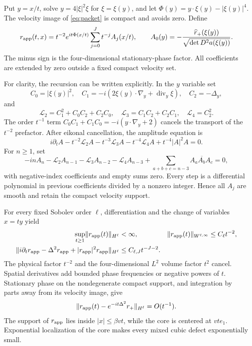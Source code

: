 \documentclass[11pt]{article}
\theoremstyle{definition}
\theoremstyle{remark}
\DeclareMathOperator{\diver}{div}
\newcommand{\norm}[1]{\lVert #1\rVert}
\begin{document}
Put $y=x/t$, solve $y=4|\xi|^2\xi$ for $\xi=\xi(y)$, and let $\Phi(y)=y\cdot\xi(y)-|\xi(y)|^4$. The velocity image of \eqref{eq:packet} is compact and avoids zero. Define
\begin{equation}\label{eq:wkb}
 r_{\rm app}(t,x)=t^{-2}e^{it\Phi(x/t)}
                 \sum_{j=0}^Jt^{-j}A_j(x/t),\qquad
 A_0(y)=-\frac{\widehat r_+(\xi(y))}
                   {\sqrt{\det D^2a(\xi(y))}}.
\end{equation}
The minus sign is the four-dimensional stationary-phase factor. All coefficients are extended by zero outside a fixed compact velocity set.

For clarity, the recursion can be written explicitly. In the $y$ variable set
\[
 C_0=|\xi(y)|^2,\quad
 C_1=-i(2\xi(y)\cdot\nabla_y+\diver_y\xi),\quad C_2=-\Delta_y,
\]
and
\[
 \mathcal L_2=C_1^2+C_0C_2+C_2C_0,\quad
 \mathcal L_3=C_1C_2+C_2C_1,\quad \mathcal L_4=C_2^2.
\]
The order $t^{-1}$ term $C_0C_1+C_1C_0=-i(y\cdot\nabla_y+2)$ cancels the transport of the $t^{-2}$ prefactor. After eikonal cancellation, the amplitude equation is
\[
 i\partial_t A-t^{-2}\mathcal L_2A-t^{-3}\mathcal L_3A
 -t^{-4}\mathcal L_4A+t^{-4}|A|^2A=0.
\]
For $n\ge1$, set
\begin{equation}\label{eq:recursion}
 -inA_n-\mathcal L_2A_{n-1}-\mathcal L_3A_{n-2}
 -\mathcal L_4A_{n-3}
 +\sum_{a+b+c=n-3}A_a\overline{A_b}A_c=0,
\end{equation}
with negative-index coefficients and empty sums zero. Every step is a differential polynomial in previous coefficients divided by a nonzero integer. Hence all $A_j$ are smooth and retain the compact velocity support.

For every fixed Sobolev order $\ell$, differentiation and the change of variables $x=ty$ yield
\begin{align}
 \sup_{t\ge1}\norm{r_{\rm app}(t)}_{H^\ell}&<\infty,
 &\norm{r_{\rm app}(t)}_{W^{\ell,\infty}}&\le C_\ell t^{-2},\label{eq:wkbbounds}\\
 \norm{i\partial_tr_{\rm app}-\Delta^2r_{\rm app}
                +|r_{\rm app}|^2r_{\rm app}}_{H^\ell}
 &\le C_{\ell,J}t^{-J-2}.&&\label{eq:wkbdefect}
\end{align}
The physical factor $t^{-2}$ and the four-dimensional $L^2$ volume factor $t^2$ cancel. Spatial derivatives add bounded phase frequencies or negative powers of $t$. Stationary phase on the nondegenerate compact support, and integration by parts away from its velocity image, give
\begin{equation}\label{eq:freecompare}
 \norm{r_{\rm app}(t)-e^{-it\Delta^2}r_+}_{H^\ell}=O(t^{-1}).
\end{equation}
The support of $r_{\rm app}$ lies inside $|x|\le\beta vt$, while the core is centered at $vte_1$. Exponential localization of the core makes every mixed cubic defect exponentially small.
\end{document}
